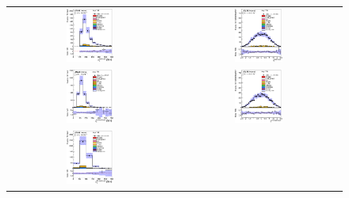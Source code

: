 \clearpage
\begin{figure}[htbp]
\begin{center}
\begin{tabular}{cc}
%
\includegraphics[width=0.30\textwidth]{appendices/figures/sdrs/JetPt1_ELEMUONCR5_1W_NOMINAL.eps} &
\includegraphics[width=0.30\textwidth]{appendices/figures/sdrs/JetEta1_ELEMUONCR5_1W_NOMINAL.eps} \\
\includegraphics[width=0.30\textwidth]{appendices/figures/sdrs/JetPt2_ELEMUONCR5_1W_NOMINAL.eps} &
\includegraphics[width=0.30\textwidth]{appendices/figures/sdrs/JetEta2_ELEMUONCR5_1W_NOMINAL.eps} \\
\includegraphics[width=0.30\textwidth]{appendices/figures/sdrs/JetPt3_ELEMUONCR5_1W_NOMINAL.eps} &

\end{tabular}
\end{center}
\end{figure}
